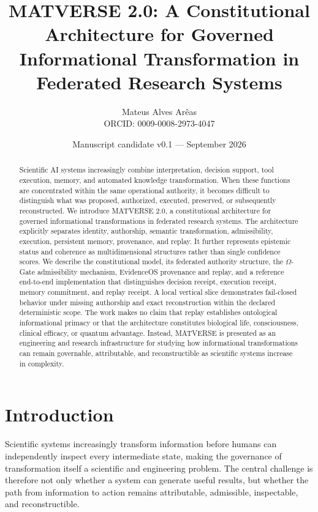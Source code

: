 \documentclass[11pt]{article}
\title{MATVERSE 2.0: A Constitutional Architecture for Governed Informational Transformation in Federated Research Systems}
\author{Mateus Alves Ar\^eas\\ORCID: 0009-0008-2973-4047}
\date{Manuscript candidate v0.1 --- September 2026}
\begin{document}
\maketitle

\begin{abstract}
Scientific AI systems increasingly combine interpretation, decision support, tool execution, memory, and automated knowledge transformation. When these functions are concentrated within the same operational authority, it becomes difficult to distinguish what was proposed, authorized, executed, preserved, or subsequently reconstructed. We introduce MATVERSE 2.0, a constitutional architecture for governed informational transformations in federated research systems. The architecture explicitly separates identity, authorship, semantic transformation, admissibility, execution, persistent memory, provenance, and replay. It further represents epistemic status and coherence as multidimensional structures rather than single confidence scores. We describe the constitutional model, its federated authority structure, the $\Omega$-Gate admissibility mechanism, EvidenceOS provenance and replay, and a reference end-to-end implementation that distinguishes decision receipt, execution receipt, memory commitment, and replay receipt. A local vertical slice demonstrates fail-closed behavior under missing authorship and exact reconstruction within the declared deterministic scope. The work makes no claim that replay establishes ontological informational primacy or that the architecture constitutes biological life, consciousness, clinical efficacy, or quantum advantage. Instead, MATVERSE is presented as an engineering and research infrastructure for studying how informational transformations can remain governable, attributable, and reconstructible as scientific systems increase in complexity.
\end{abstract}

\section{Introduction}

Scientific systems increasingly transform information before humans can independently inspect every intermediate state, making the governance of transformation itself a scientific and engineering problem. The central challenge is therefore not only whether a system can generate useful results, but whether the path from information to action remains attributable, admissible, inspectable, and reconstructible.
\end{document}
